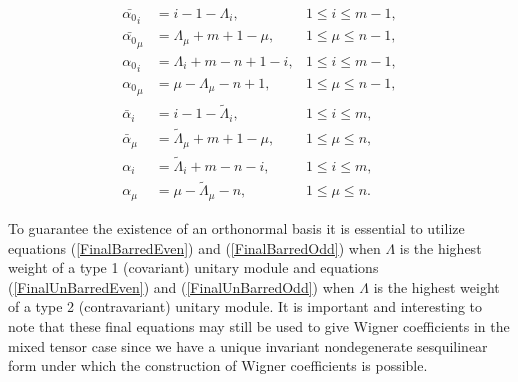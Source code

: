 \documentclass[12pt]{article}
\begin{document}
\begin{align*}
{\bar{\alpha_0}}_i &= i - 1 -\Lambda_i  , &1\leq i\leq m-1, \\
{\bar{\alpha_0}}_\mu &= \Lambda_\mu + m + 1 - \mu  ,  &1\leq \mu \leq n-1 , \\ 
{\alpha_0}_i &= \Lambda_i + m - n + 1 - i  , &1\leq i\leq m-1, \\
{\alpha_0}_\mu &= \mu - \Lambda_\mu -n + 1, &1\leq \mu \leq n-1 , \\
\bar{\alpha}_i  &= i - 1 -{\tilde{\Lambda}}_i , &1\leq i\leq m, \\
\bar{\alpha}_\mu &= {\tilde{\Lambda}}_\mu + m + 1 - \mu,  &1\leq \mu \leq n , \\
\alpha_i &= {\tilde{\Lambda}}_i + m - n - i, &1\leq i\leq m, \\
\alpha_\mu &= \mu-{\tilde{\Lambda}}_\mu - n, &1\leq \mu \leq n .  
\end{align*}

To guarantee the existence of an orthonormal basis it is essential to utilize equations (\ref{FinalBarredEven}) and (\ref{FinalBarredOdd}) when $\Lambda$ is the highest weight of a type 1 (covariant) unitary module and equations (\ref{FinalUnBarredEven}) and (\ref{FinalUnBarredOdd}) when $\Lambda$ is the highest weight of a type 2 (contravariant) unitary module. It is important and interesting to note that these final equations may still be used to give Wigner coefficients in the mixed tensor case since we have a unique invariant nondegenerate sesquilinear form under which the construction of Wigner coefficients is possible.
\end{document}
